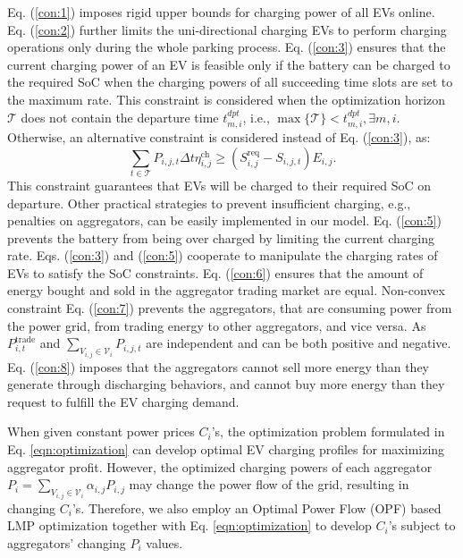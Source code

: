 \documentclass[conference]{IEEEtran}
\begin{document}
    \vspace{-0.35cm}
\hspace{-0.4cm}	Eq. (\ref{con:1}) imposes rigid upper bounds for charging power of all EVs online. 
Eq. (\ref{con:2}) further limits the uni-directional charging EVs to perform charging operations only  during the whole parking process.
Eq. (\ref{con:3}) ensures that the current charging power of an EV is feasible only if the battery can be charged to the required SoC when the charging powers of all succeeding time slots are set to the maximum rate. This constraint is considered when the optimization horizon $\mathcal{T}$ does not contain the departure time $t^\textit{dpt}_{m,i}$, i.e., $\max\{\mathcal{T}\}<t^\textit{dpt}_{m,i},\exists m,i$.
Otherwise, an alternative constraint is considered instead of Eq. (\ref{con:3}), as:
	\begin{equation}\label{con:4}
		\sum_{t\in\mathcal{T}}P_{i,j,t}\Delta t\eta^\text{ch}_{i,j} \geq (S^\text{req}_{i,j} - S_{i,j,t})E_{i,j}.
	\end{equation}
    This constraint guarantees that EVs will be charged to their required SoC on departure. Other practical strategies to prevent insufficient charging, e.g., penalties on aggregators, can be easily implemented in our model.
Eq. (\ref{con:5}) prevents the battery from being over charged by limiting the current charging rate.
Eqs. (\ref{con:3}) and (\ref{con:5}) cooperate to manipulate the charging rates of EVs to satisfy the SoC constraints.
Eq. (\ref{con:6}) ensures that the amount of energy bought and sold in the aggregator trading market are equal. Non-convex constraint Eq. (\ref{con:7}) prevents the aggregators, that are consuming power from the power grid, from trading energy to other aggregators, and vice versa. As $P^\text{trade}_{i,t}$ and $\sum_{V_{i,j}\in\mathcal{V}_i}P_{i,j,t}$ are independent and can be both positive and negative. Eq. (\ref{con:8}) imposes that the aggregators cannot sell more energy than they generate through discharging behaviors, and cannot buy more energy than they request to fulfill the EV charging demand. 
    
    When given constant power prices $C_i$'s, the optimization problem formulated in Eq. \eqref{eqn:optimization} can develop optimal EV charging profiles for maximizing aggregator profit. However, the optimized charging powers of each aggregator $P_i=\sum_{V_{i,j}\in\mathcal{V}_i}\alpha_{i,j}P_{i,j}$ may change the power flow of the grid, resulting in changing $C_i$'s. Therefore, we also employ an Optimal Power Flow (OPF) based LMP optimization together with Eq. \eqref{eqn:optimization} to develop $C_i$'s subject to aggregators' changing $P_i$ values.
	
\end{document}
